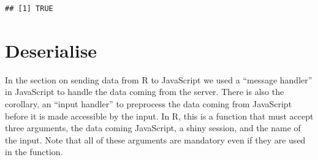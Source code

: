 \documentclass[
]{krantz}
\makeatletter
\newenvironment{Shaded}{\begin{snugshade}}{\end{snugshade}}
\newcommand{\CommentTok}[1]{\textcolor[rgb]{0.37,0.37,0.37}{\textit{#1}}}
\newcommand{\ControlFlowTok}[1]{\textcolor[rgb]{0.27,0.27,0.27}{\textbf{#1}}}
\newcommand{\DataTypeTok}[1]{\textcolor[rgb]{0.27,0.27,0.27}{#1}}
\newcommand{\KeywordTok}[1]{\textcolor[rgb]{0.27,0.27,0.27}{\textbf{#1}}}
\newcommand{\NormalTok}[1]{#1}
\newcommand{\OperatorTok}[1]{\textcolor[rgb]{0.43,0.43,0.43}{\textbf{#1}}}
\newcommand{\StringTok}[1]{\textcolor[rgb]{0.5,0.5,0.5}{#1}}
\newenvironment{kframe}{%
\medskip{}
\setlength{\fboxsep}{.8em}
 \def\at@end@of@kframe{}%
 \ifinner\ifhmode%
  \def\at@end@of@kframe{\end{minipage}}%
  \begin{minipage}{\columnwidth}%
 \fi\fi%
 \def\FrameCommand##1{\hskip\@totalleftmargin \hskip-\fboxsep
 \colorbox{shadecolor}{##1}\hskip-\fboxsep
     \hskip-\linewidth \hskip-\@totalleftmargin \hskip\columnwidth}%
 \MakeFramed {\advance\hsize-\width
   \@totalleftmargin\z@ \linewidth\hsize
   \@setminipage}}%
 {\par\unskip\endMakeFramed%
 \at@end@of@kframe}
\renewenvironment{Shaded}{\begin{kframe}}{\end{kframe}}
\makeatother
\begin{document}
\begin{Shaded}
\end{Shaded}

\begin{verbatim}
## [1] TRUE
\end{verbatim}

\hypertarget{shiny-intro-deserialise}{%
\section{Deserialise}\label{shiny-intro-deserialise}}

In the section on sending data from R to JavaScript we used a ``message handler'' in JavaScript to handle the data coming from the server. There is also the corollary, an ``input handler'' to preprocess the data coming from JavaScript before it is made accessible by the input. In R, this is a function that must accept three arguments, the data coming JavaScript, a shiny session, and the name of the input. Note that all of these arguments are mandatory even if they are used in the function.
\end{document}

